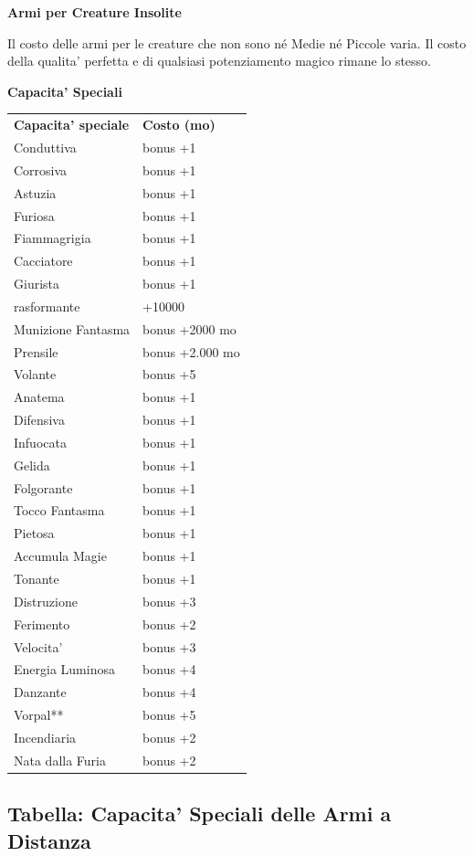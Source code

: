 \documentclass[a4paper,11pt,twoside,openany]{book}
\begin{document}
{\textbf{Armi per Creature Insolite}

Il costo delle armi per le creature che non sono né Medie né Piccole varia. Il costo della qualita' perfetta e di qualsiasi potenziamento
magico rimane lo stesso.

\bigskip

\textbf{Capacita' Speciali}

\bigskip

\begin{tabular}{ll}
\toprule
\textbf{Capacita' speciale} & \textbf{Costo (mo)}\tabularnewline
Conduttiva \index{Conduttiva} & bonus +1\tabularnewline
Corrosiva\index{Corrosiva} & bonus +1\tabularnewline
Astuzia \index{Astuzia}& bonus +1\tabularnewline
Furiosa \index{Furiosa} & bonus +1\tabularnewline
Fiammagrigia \index{Fiammagrigia}& bonus +1\tabularnewline
Cacciatore \index{Cacciatore} & bonus +1\tabularnewline
Giurista \index{Giurista} & bonus +1\tabularnewline
rasformante \index{Trasformante} & +10000\tabularnewline
Munizione Fantasma \index{Munizione Fantasma} & bonus +2000 mo\tabularnewline
Prensile \index{Prensile}& bonus +2.000 mo\tabularnewline
Volante \index{Volante}& bonus +5\tabularnewline
Anatema\index{Anatema} & bonus +1\tabularnewline
Difensiva\index{Difensiva} & bonus +1\tabularnewline
Infuocata \index{Infuocata}& bonus +1\tabularnewline
Gelida \index{Gelida} & bonus +1\tabularnewline
Folgorante \index{Folgorante} & bonus +1\tabularnewline
Tocco Fantasma \index{Tocco Fantasma} & bonus +1\tabularnewline
Pietosa \index{Pietosa} & bonus +1\tabularnewline
Accumula Magie \index{Accumula Magie} & bonus +1\tabularnewline
Tonante \index{Tonante} & bonus +1\tabularnewline
Distruzione \index{Distruzione}& bonus +3\tabularnewline
Ferimento \index{Ferimento} & bonus +2\tabularnewline
Velocita' \index{Velocita'} & bonus +3\tabularnewline
Energia Luminosa \index{Energia Luminosa}& bonus +4\tabularnewline
Danzante \index{Danzante} & bonus +4\tabularnewline
Vorpal** \index{Vorpal} & bonus +5\tabularnewline
Incendiaria \index{Incendiaria} & bonus +2\tabularnewline
Nata dalla Furia \index{Nata dalla Furia} & bonus +2\tabularnewline
\end{tabular}

\subsection{Tabella: Capacita' Speciali delle Armi a Distanza}

\label{tabella-capacita-speciali-delle-armi-a-distanza}

}
\end{document}
